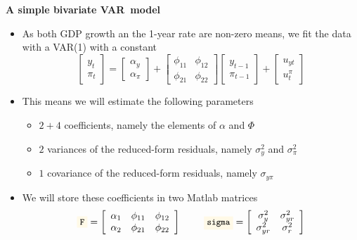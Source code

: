 \documentclass[10pt,english,t,aspectratio=169,ignorenonframetext]{beamer}
\begin{document}

\begin{frame}
{\textbf{A simple bivariate VAR\ model}}\medskip 

\begin{itemize}
\item As both GDP growth an the 1-year rate are non-zero means, we fit the
data with a VAR(1) with a constant\medskip 
\begin{equation*}
\begin{bmatrix}
y_{t} \\ 
\pi _{t}%
\end{bmatrix}%
=%
\begin{bmatrix}
\alpha _{y} \\ 
\alpha _{\pi }%
\end{bmatrix}%
+\left[ 
\begin{array}{cc}
\phi _{11} & \phi _{12} \\ 
\phi _{21} & \phi _{22}%
\end{array}%
\right] 
\begin{bmatrix}
y_{t-1} \\ 
\pi _{t-1}%
\end{bmatrix}%
+%
\begin{bmatrix}
u_{yt}\\ 
u_{t}^{\pi }%
\end{bmatrix}%
\end{equation*}%
\bigskip

\item This means we will estimate the following parameters\smallskip

\begin{itemize}
\item $2+4$ coefficients, namely the elements of $\alpha $ and $\Phi $%
\medskip

\item $2$ variances of the reduced-form residuals, namely $\sigma _{y}^{2}$
and $\sigma _{\pi }^{2}$\medskip

\item $1$ covariance of the reduced-form residuals, namely $\sigma _{y\pi }$%
\bigskip \smallskip
\end{itemize}

\item We will store these coefficients in two Matlab matrices\medskip 
\begin{equation*}
\text{\colorbox{script!80}{\small\texttt{F}}}=\left[ 
\begin{array}{ccc}
\alpha _{1} & \phi _{11} & \phi _{12} \\ 
\alpha _{2} & \phi _{21} & \phi _{22}%
\end{array}%
\right] \ \ \ \ \ \ \ \text{\colorbox{script!80}{\small\texttt{sigma}}}=%
\left[ 
\begin{array}{cc}
\sigma _{y}^{2} & \sigma _{yr}^{2} \\ 
\sigma _{yr}^{2} & \sigma _{r}^{2}%
\end{array}%
\right]
\end{equation*}
\end{itemize}
\end{frame}
\end{document}

